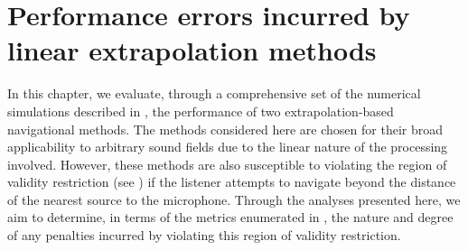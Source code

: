 \chapter{Performance errors incurred by linear extrapolation methods}\label{chap:07_Characterization_Extrapolation}
In this chapter, we evaluate, through a comprehensive set of the numerical simulations described in , the performance of two extrapolation-based navigational methods.
The methods considered here are chosen for their broad applicability to arbitrary sound fields due to the linear nature of the processing involved.
However, these methods are also susceptible to violating the region of validity restriction (see ) if the listener attempts to navigate beyond the distance of the nearest source to the microphone.
Through the analyses presented here, we aim to determine, in terms of the metrics enumerated in , the nature and degree of any penalties incurred by violating this region of validity restriction.



